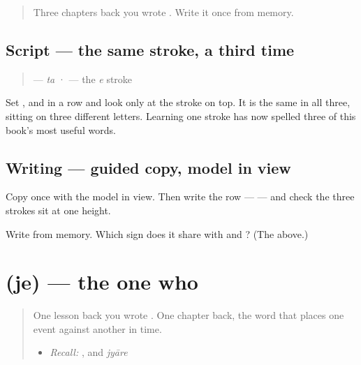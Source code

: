 \label{lesson:GU-C36-te-write}



\begin{quote}
Three chapters back you wrote \textbf{}. Write it once from memory.
\end{quote}

\subsection*{Script — the same stroke, a third time}
\begin{quote}
\textbf{} — \emph{ta} · \textbf{} — the \emph{e} stroke
\end{quote}

Set \textbf{}, \textbf{} and \textbf{} in a row and look only at the stroke on top. It is the same \textbf{} in all three, sitting on three different letters. Learning one stroke has now spelled three of this book's most useful words.

\subsection*{Writing — guided copy, model in view}

Copy \textbf{} once with the model in view. Then write the row — \textbf{  } — and check the three strokes sit at one height.

\begin{tcolorbox}[breakable,colback=teal!4,colframe=teal!35!black,title={Before you move on}]
Write \textbf{} from memory. Which sign does it share with \textbf{} and \textbf{}? (The \textbf{} above.)
\end{tcolorbox}
\section[\texorpdfstring{\gu{જે} (je)}{જે (je)}]{ (je) — the one who}

\label{lesson:GU-C36-je}



\begin{quote}
One lesson back you wrote \textbf{}. One chapter back, the word that places one event against another in time.

\begin{itemize}
\raggedright
  \item \emph{Recall:} \textbf{}, and \emph{jyāre}
\end{itemize}
\end{quote}

